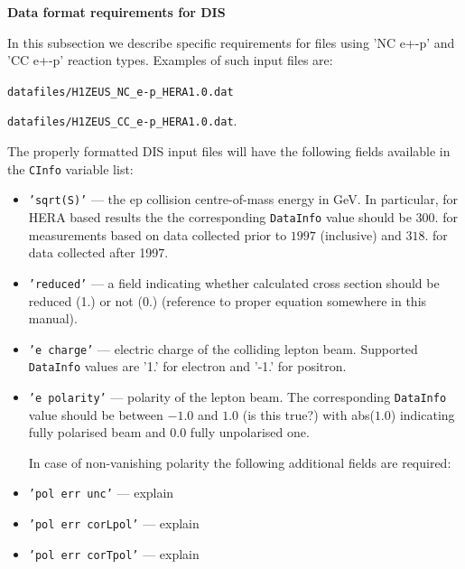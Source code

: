 \begin{description}
\item \bf{Data format requirements for DIS}\rm

In this subsection we describe specific requirements for files using 'NC e+-p' and 'CC e+-p'
reaction types. Examples of such input files are:

{\tt datafiles/H1ZEUS\_NC\_e-p\_HERA1.0.dat}

{\tt datafiles/H1ZEUS\_CC\_e-p\_HERA1.0.dat}.

The properly formatted DIS input files will have the following fields available
in the {\tt CInfo} variable list: 

\begin{itemize} 
    \item  {\tt 'sqrt(S)'} --- the ep collision centre-of-mass energy in GeV. In particular, for 
    HERA based results the the corresponding {\tt DataInfo} value should be $300.$ for measurements
    based on data collected prior to $1997$ (inclusive) and $318.$ for data collected after 1997.
    
    \item {\tt 'reduced'} --- a field indicating whether calculated cross section should be reduced (1.) or not (0.)
    (reference to proper equation somewhere in this manual).
    
    \item {\tt 'e charge'} --- electric charge of the colliding lepton beam. Supported {\tt DataInfo} values
    are '1.' for electron and '-1.' for positron.

    \item {\tt 'e polarity'} --- polarity of the lepton beam. The corresponding {\tt DataInfo} value 
    should be between $-1.0$ and $1.0$ (is this true?) with abs($1.0$) indicating fully polarised
    beam and $0.0$ fully unpolarised one. 

    In case of non-vanishing polarity the following additional fields are required:

    \item {\tt 'pol err unc'} --- explain

    \item {\tt 'pol err corLpol'} --- explain
 
    \item {\tt 'pol err corTpol'} --- explain

\end{itemize}


\end{description}
